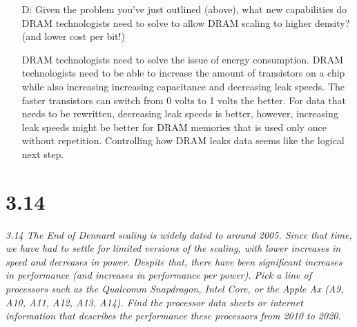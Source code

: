 \documentclass[10pt]{article}
\begin{document}
\begin{itemize}
    \item[D:]Given the problem you’ve just outlined (above), what new capabilities do DRAM technologists need to solve to allow DRAM scaling to higher density? (and lower cost per
    bit!)

    \item[] DRAM technologists need to solve the issue of energy consumption. DRAM technologists need to be able to increase the amount of transistors on a chip while also increasing 
    increasing capacitance and decreasing leak speeds. The faster transistors can switch from 0 volts to 1 volts the better. For data that needs to be rewritten, decreasing leak 
    speeds is better, however, increasing leak speeds might be better for DRAM memories that is used only once without repetition. Controlling how DRAM leaks data seems like 
    the logical next step. 

\end{itemize}

\section{3.14}
\textit{3.14 The End of Dennard scaling is widely dated to around 2005. Since that time, we
have had to settle for limited versions of the scaling, with lower increases in speed and
decreases in power. Despite that, there have been significant increases in performance (and
increases in performance per power). Pick a line of processors such as the Qualcomm
Snapdragon, Intel Core, or the Apple Ax (A9, A10, A11, A12, A13, A14). Find the processor data sheets or internet information that describes the performance these processors
from 2010 to 2020.}
\end{document}

